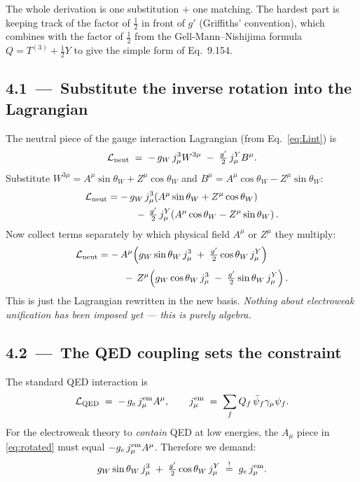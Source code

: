 \documentclass[11pt]{article}
\begin{document}
\begin{strategybox}
The whole derivation is one substitution + one matching. The hardest part is keeping track
of the factor of $\tfrac{1}{2}$ in front of $g'$ (Griffiths' convention), which combines
with the factor of $\tfrac{1}{2}$ from the Gell-Mann--Nishijima formula $Q = T^{(3)} + \tfrac{1}{2} Y$
to give the simple form of Eq.~9.154.
\end{strategybox}

\subsection*{4.1 \,---\, Substitute the inverse rotation into the Lagrangian}

\begin{stepbox}[title=Step 4.1: Plug in $W^3$ and $B$ in terms of $A$ and $Z$]
The neutral piece of the gauge interaction Lagrangian (from Eq.~\ref{eq:Lint}) is
\[
\mathcal{L}_{\rm neut} \;=\; -\, g_W\, j^3_\mu W^{3\mu} \;-\; \tfrac{g'}{2}\, j^Y_\mu B^\mu .
\]
Substitute $W^{3\mu} = A^\mu \sin\theta_W + Z^\mu \cos\theta_W$ and
$B^\mu = A^\mu \cos\theta_W - Z^\mu \sin\theta_W$:
\begin{align}
\mathcal{L}_{\rm neut}
&= -\, g_W\, j^3_\mu \!\left( A^\mu \sin\theta_W + Z^\mu \cos\theta_W \right) \notag\\
&\qquad\;\;\; -\, \tfrac{g'}{2}\, j^Y_\mu \!\left( A^\mu \cos\theta_W - Z^\mu \sin\theta_W \right) .
\end{align}
Now collect terms separately by which physical field $A^\mu$ or $Z^\mu$ they multiply:
\begin{align}
\mathcal{L}_{\rm neut}
&= -\,A^\mu \!\left( g_W \sin\theta_W \, j^3_\mu \;+\; \tfrac{g'}{2} \cos\theta_W \, j^Y_\mu \right) \notag\\[2pt]
&\qquad\;\; -\,Z^\mu \!\left( g_W \cos\theta_W \, j^3_\mu \;-\; \tfrac{g'}{2} \sin\theta_W \, j^Y_\mu \right) .
\label{eq:rotated}
\end{align}
This is just the Lagrangian rewritten in the new basis. \emph{Nothing about electroweak
unification has been imposed yet --- this is purely algebra.}
\end{stepbox}

\subsection*{4.2 \,---\, The QED coupling sets the constraint}

\begin{stepbox}[title=Step 4.2: Demand that the photon term has QED form]
The standard QED interaction is
\[
\mathcal{L}_{\rm QED} \;=\; -\, g_e\, j^{\rm em}_\mu A^\mu ,
\qquad
j^{\rm em}_\mu \;=\; \sum_f Q_f \,\bar\psi_f \gamma_\mu \psi_f .
\]
For the electroweak theory to \emph{contain} QED at low energies, the $A_\mu$ piece in
\eqref{eq:rotated} must equal $-g_e\, j^{\rm em}_\mu A^\mu$. Therefore we demand:
\[
g_W \sin\theta_W \, j^3_\mu \;+\; \tfrac{g'}{2} \cos\theta_W \, j^Y_\mu
\;\stackrel{!}{=}\; g_e\, j^{\rm em}_\mu .
\]
\end{stepbox}
\end{document}
